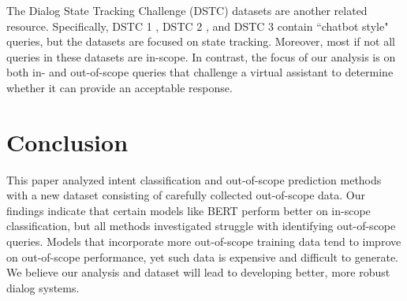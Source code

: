 \documentclass[11pt,a4paper]{article}
\begin{document}
The Dialog State Tracking Challenge (DSTC) datasets are another related resource.
Specifically, DSTC 1 \cite{dstc1}, DSTC 2 \cite{dstc2}, and DSTC 3 \cite{dstc3} contain ``chatbot style" queries, but the datasets are focused on state tracking. Moreover, most if not all queries in these datasets are in-scope.  In contrast, the focus of our analysis is on both in- and out-of-scope queries that challenge a virtual assistant to determine whether it can provide an acceptable response.

%

\section{Conclusion}
This paper analyzed intent classification and out-of-scope prediction methods with a new dataset consisting of carefully collected out-of-scope data. Our findings indicate that certain models like BERT perform better on in-scope classification, but all methods investigated struggle with identifying out-of-scope queries. Models that incorporate more out-of-scope training data tend to improve on out-of-scope performance, yet such data is expensive and difficult to generate. We believe our analysis and dataset will lead to developing better, more robust dialog systems.
\end{document}
